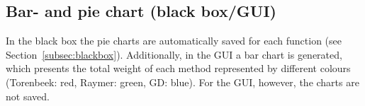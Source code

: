 \subsection{Bar- and pie chart (black box/GUI)}
\label{subsec:chart}
In the black box the pie charts are automatically saved for each function (see Section~\ref{subsec:blackbox}). Additionally, in the GUI a bar chart is generated, which presents the total weight of each method represented by different colours (Torenbeek: red, Raymer: green, GD: blue). For the GUI, however, the charts are not saved.
